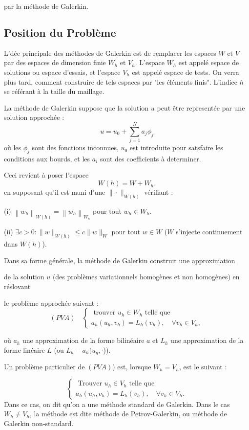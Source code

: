 par la méthode de Galerkin.

\subsection{Position du Problème}


L'dée principale des méthodes de Galerkin est de remplacer les espaces $W$ et $V$ par des espaces de dimension finie $W_{h}$ et $V_{h}$. L'espace $W_{h}$ est appelé espace de solutions ou espace d'essais, et l'espace $V_{h}$ est appelé espace de tests. On verra plus tard, comment construire de tels espaces par "les éléments finis". L'indice $h$ se référant à la taille du maillage. 


La méthode de Galerkin  suppose que  la solution  $u$ peut être  representée par une  solution  approchée :
$$
u=u_{0}+\sum_{j=1}^{N} a_{j} \phi_{j}
$$
où  les $\phi_{j}$  sont des  fonctions inconnues, $u_{0}$ est introduite  pour satsfaire les  conditions aux bourds, et les  $a_{i}$  sont des coefficients à determiner.



Ceci revient à  poser  l'espace
$$
W(h)=W+W_{h}.
$$
en supposant  qu'il est muni d'une  $\|\cdot\|_{W(h)}$ vérifiant :


(i) $\left\|w_{h}\right\|_{W(h)}=\left\|w_{h}\right\|_{W_{h}}$ pour tout  $w_{h} \in W_{h}$.

(ii) $\exists c>0: \|w\|_{W(h)} \leq c\|w\|_{W}$ pour tout  $w \in W$ ($W$ s'injecte  continuement dans  $W(h)$).

Dans sa forme générale, la méthode de Galerkin construit   une approximation 

de  la solution $u$ (des problèmes variationnels homogènes et non homogènes) 
en réslovant 

le problème approchée suivant :
$$
(PVA)\quad \left\{\begin{array}{l}
	\text { trouver  } u_{h} \in W_{h} \text { telle que  } \\
	a_{h}\left(u_{h}, v_{h}\right)=L_{h}\left(v_{h}\right), \quad \forall v_{h} \in V_{h}, 
\end{array}\right.
$$

où $a_{h}$ une approximation  de la forme bilinéaire $a$  et  $L_{h}$ une approximation de la forme  linéaire $L$ (ou $L_h-a_h(u_g, \cdot$)).

Un problème particulier de  $(PVA)$)  est,  lorsque  $W_h=V_{h}$,  est le suivant :

$$
\left\{\begin{array}{l}
	\text { Trouver  } u_{h} \in V_{h} \text { telle que  } \\
	a_{h}\left(u_{h}, v_{h}\right)=L_{h}\left(v_{h}\right), \quad \forall v_{h} \in V_{h}. 
\end{array}\right.
$$
Dans ce cas, on dit qu'on a une méthode  standard de Galerkin. Dans le cas $W_h\neq V_{h}$, la méthode est dite  méthode de Petrov-Galerkin, ou méthode  de Galerkin  
 non-standard.

